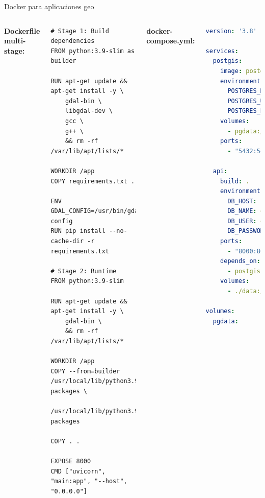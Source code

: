 \documentclass[10pt,aspectratio=169]{beamer}
\begin{document}
\begin{frame}[fragile]{Docker para aplicaciones geo}
    \begin{columns}[T]
        \textbf{Dockerfile multi-stage:}
        \begin{lstlisting}[language=Docker]
# Stage 1: Build dependencies
FROM python:3.9-slim as builder

RUN apt-get update && apt-get install -y \
    gdal-bin \
    libgdal-dev \
    gcc \
    g++ \
    && rm -rf /var/lib/apt/lists/*

WORKDIR /app
COPY requirements.txt .

ENV GDAL_CONFIG=/usr/bin/gdal-config
RUN pip install --no-cache-dir -r requirements.txt

# Stage 2: Runtime
FROM python:3.9-slim

RUN apt-get update && apt-get install -y \
    gdal-bin \
    && rm -rf /var/lib/apt/lists/*

WORKDIR /app
COPY --from=builder /usr/local/lib/python3.9/site-packages \
                   /usr/local/lib/python3.9/site-packages

COPY . .

EXPOSE 8000
CMD ["uvicorn", "main:app", "--host", "0.0.0.0"]
        \end{lstlisting}
        
        \column{0.45\textwidth}
        \textbf{docker-compose.yml:}
        \begin{lstlisting}[language=yaml]
version: '3.8'

services:
  postgis:
    image: postgis/postgis:14-3.2
    environment:
      POSTGRES_DB: geodata
      POSTGRES_USER: geouser
      POSTGRES_PASSWORD: ${DB_PASSWORD}
    volumes:
      - pgdata:/var/lib/postgresql/data
    ports:
      - "5432:5432"
  
  api:
    build: .
    environment:
      DB_HOST: postgis
      DB_NAME: geodata
      DB_USER: geouser
      DB_PASSWORD: ${DB_PASSWORD}
    ports:
      - "8000:8000"
    depends_on:
      - postgis
    volumes:
      - ./data:/app/data

volumes:
  pgdata:
        \end{lstlisting}
    \end{columns}
\end{frame}
\end{document}
